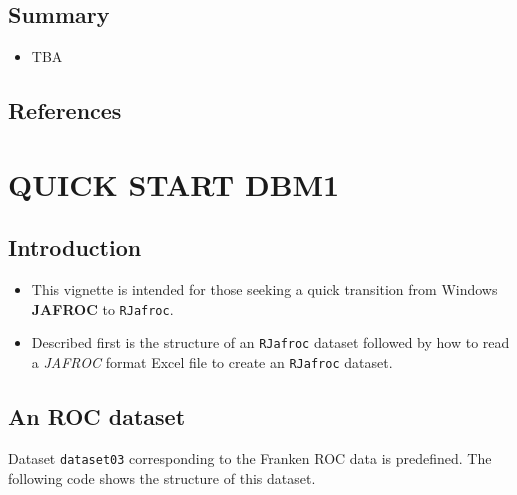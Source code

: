 \documentclass[]{book}
\providecommand{\tightlist}{%
  \setlength{\itemsep}{0pt}\setlength{\parskip}{0pt}}
\begin{document}
\hypertarget{summary-2}{%
\section{Summary}\label{summary-2}}

\begin{itemize}
\tightlist
\item
  TBA
\end{itemize}

\hypertarget{references-4}{%
\section{References}\label{references-4}}

\hypertarget{QuickStartDBM1}{%
\chapter{QUICK START DBM1}\label{QuickStartDBM1}}

\hypertarget{introduction-4}{%
\section{Introduction}\label{introduction-4}}

\begin{itemize}
\tightlist
\item
  This vignette is intended for those seeking a quick transition from Windows \textbf{JAFROC} to \texttt{RJafroc}.
\item
  Described first is the structure of an \texttt{RJafroc} dataset followed by how to read
  a \emph{JAFROC} format Excel file to create an \texttt{RJafroc} dataset.
\end{itemize}

\hypertarget{an-roc-dataset}{%
\section{An ROC dataset}\label{an-roc-dataset}}

Dataset \texttt{dataset03} corresponding to the Franken ROC data \citep{RN1995} is predefined. The following code shows the structure of this dataset.
\end{document}
